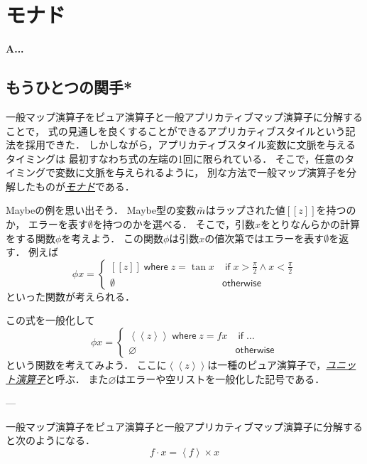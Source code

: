\documentclass[a5paper,draft]{jsbook}
\def\[{\left[\!\left[}
\def\]{\right]\!\right]}
\newenvironment{leader}{\begingroup\bf}{\endgroup}
\newcommand{\keyword}[1]{{\underline{\emph{#1}}}}
\newcommand{\mathMaybeVar}[1]{\Tilde{#1}}
\newcommand{\mathMaybeWith}[1]{\[#1\]}
\newcommand{\mathPureWith}[1]{\left\langle#1\right\rangle}
\newcommand{\mathUnitWith}[1]{\left\langle\!\left\langle#1\right\rangle\!\right\rangle}
\newcommand{\mathNothing}{\emptyset}
\newcommand{\mathPureNothing}{\varnothing}
\newcommand{\mathAnd}{\mathbin{\wedge}}
\newcommand{\mathApplicativeGeneralMap}{\mathbin{\times}}
\newcommand{\mathGeneralMap}{\mathbin{\cdot}}
\newcommand{\mathKeyword}[1]{\operatorname{\textsf{#1}}}
\newcommand{\mathIf}{\mathKeyword{if}}
\newcommand{\mathOtherwise}{\mathKeyword{otherwise}}
\newcommand{\mathWhere}{\mathKeyword{where}}
\begin{document}
\chapter{モナド}

\begin{leader}
A...
\end{leader}


\section{もうひとつの関手*}


一般マップ演算子をピュア演算子と一般アプリカティブマップ演算子に分解することで，
式の見通しを良くすることができるアプリカティブスタイルという記法を採用できた．
しかしながら，アプリカティブスタイル変数に文脈を与えるタイミングは
最初すなわち式の左端の1回に限られている．
そこで，任意のタイミングで変数に文脈を与えられるように，
別な方法で一般マップ演算子を分解したものが\keyword{モナド}である．

Maybeの例を思い出そう．
Maybe型の変数$\mathMaybeVar{m}$はラップされた値$\mathMaybeWith{z}$を持つのか，
エラーを表す$\mathNothing$を持つのかを選べる．
そこで，引数$x$をとりなんらかの計算をする関数$\phi$を考えよう．
この関数$\phi$は引数$x$の値次第ではエラーを表す$\mathNothing$を返す．
例えば
\begin{equation}
\phi x=\begin{cases}
\mathMaybeWith{z}\mathWhere z=\tan x&\mathIf x>\frac{\pi}{2}\mathAnd x<\frac{\pi}{2}\\
\mathNothing&\mathOtherwise
\end{cases}
\end{equation}
といった関数が考えられる．

この式を一般化して
\begin{equation}
\phi x=\begin{cases}
\mathUnitWith{z}\mathWhere z=fx&\mathIf\dots\\
\mathPureNothing&\mathOtherwise
\end{cases}
\end{equation}
という関数を考えてみよう．
ここに$\mathUnitWith{z}$は一種のピュア演算子で，\keyword{ユニット演算子}と呼ぶ．
また$\mathPureNothing$はエラーや空リストを一般化した記号である．

---

一般マップ演算子をピュア演算子と一般アプリカティブマップ演算子に分解すると次のようになる．
\begin{equation}
f\mathGeneralMap x=\mathPureWith{f}\mathApplicativeGeneralMap x
\end{equation}
\end{document}
